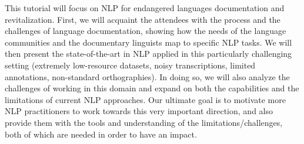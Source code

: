 This tutorial will focus on NLP for endangered languages documentation and revitalization. First, we will acquaint the attendees with the process and the challenges of language documentation, showing how the needs of the language communities and the documentary linguists map to specific NLP tasks. We will then present the state-of-the-art in NLP applied in this particularly challenging setting (extremely low-resource datasets, noisy transcriptions, limited annotations, non-standard orthographies). In doing so, we will also analyze the challenges of working in this domain and expand on both the capabilities and the limitations of current NLP approaches. Our ultimate goal is to motivate more NLP practitioners to work towards this very important direction, and also provide them with the tools and understanding of the limitations/challenges, both of which are needed in order to have an impact.
